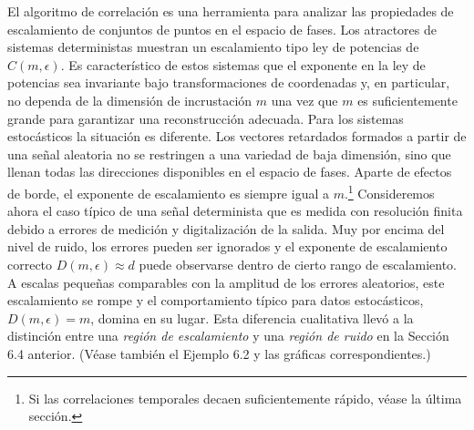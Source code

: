 \documentclass[10pt,a4paper]{book}
\begin{document}
El algoritmo de correlación es una herramienta para analizar las propiedades de escalamiento de conjuntos de puntos en el espacio de fases. Los atractores de sistemas deterministas muestran un escalamiento tipo ley de potencias de $C(m, \epsilon)$. Es característico de estos sistemas que el exponente en la ley de potencias sea invariante bajo transformaciones de coordenadas y, en particular, no dependa de la dimensión de incrustación $m$ una vez que $m$ es suficientemente grande para garantizar una reconstrucción adecuada. Para los sistemas estocásticos la situación es diferente. Los vectores retardados formados a partir de una señal aleatoria no se restringen a una variedad de baja dimensión, sino que llenan todas las direcciones disponibles en el espacio de fases. Aparte de efectos de borde, el exponente de escalamiento es siempre igual a $m$.\footnote{Si las correlaciones temporales decaen suficientemente rápido, véase la última sección.} Consideremos ahora el caso típico de una señal determinista que es medida con resolución finita debido a errores de medición y digitalización de la salida. Muy por encima del nivel de ruido, los errores pueden ser ignorados y el exponente de escalamiento correcto $D(m, \epsilon) \approx d$ puede observarse dentro de cierto rango de escalamiento. A escalas pequeñas comparables con la amplitud de los errores aleatorios, este escalamiento se rompe y el comportamiento típico para datos estocásticos, $D(m, \epsilon) = m$, domina en su lugar. Esta diferencia cualitativa llevó a la distinción entre una \textit{región de escalamiento} y una \textit{región de ruido} en la Sección 6.4 anterior. (Véase también el Ejemplo 6.2 y las gráficas correspondientes.)

\bigskip
\end{document}
